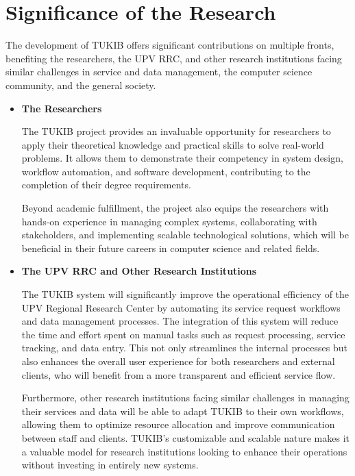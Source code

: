 \section{Significance of the Research}
\label{sec:significance}

The development of TUKIB offers significant contributions on multiple fronts, benefiting the researchers, the UPV RRC, and other research institutions facing similar challenges in service and data management, the computer science community, and the general society.

\begin{itemize}
	
\item \textbf{The Researchers}

\subitem The TUKIB project provides an invaluable opportunity for researchers to apply their theoretical knowledge and practical skills to solve real-world problems. It allows them to demonstrate their competency in system design, workflow automation, and software development, contributing to the completion of their degree requirements.
	
\subitem Beyond academic fulfillment, the project also equips the researchers with hands-on experience in managing complex systems, collaborating with stakeholders, and implementing scalable technological solutions, which will be beneficial in their future careers in computer science and related fields.\newline

\item \textbf{The UPV RRC and Other Research Institutions}

\subitem The TUKIB system will significantly improve the operational efficiency of the UPV Regional Research Center by automating its service request workflows and data management processes. The integration of this system will reduce the time and effort spent on manual tasks such as request processing, service tracking, and data entry. This not only streamlines the internal processes but also enhances the overall user experience for both researchers and external clients, who will benefit from a more transparent and efficient service flow.

\subitem Furthermore, other research institutions facing similar challenges in managing their services and data will be able to adapt TUKIB to their own workflows, allowing them to optimize resource allocation and improve communication between staff and clients. TUKIB’s customizable and scalable nature makes it a valuable model for research institutions looking to enhance their operations without investing in entirely new systems.\newline


\end{itemize}
